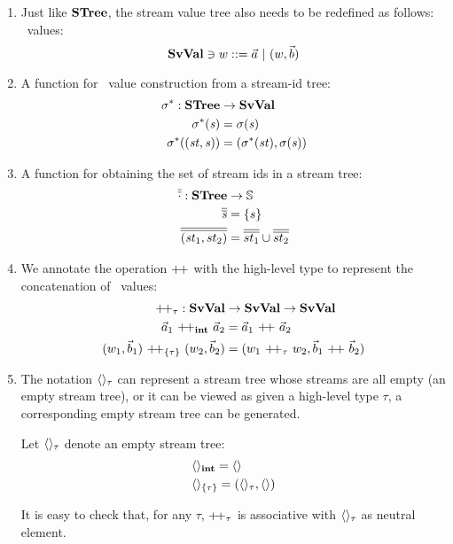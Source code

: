 \begin{enumerate}[(1)]
	\item Just like $\mathbf{STree}$, the stream value tree also needs to be redefined as follows:  
	\fmsvcode \  values: $$\SvVal \ni \v ::= \a \ | \ (\v,\b) $$
	
	\item A function for \fmsvcode \  value construction from a stream-id tree:
	\begin{align*}
	\sgm^* : \STree & \-> \SvVal \\
	\sgm^*(\s) & = \sgm(\s) \\
	\sgm^*((\st,\s)) & = (\sgm^*(\st), \sgm(\s)) 
	\end{align*}
	
	\item A function for obtaining the set of stream ids in a stream tree:	
	\begin{align*}
	\olol{\cdot} : \STree & \-> \mathbb{S} \\
	\olol{\s} & = \{s\} \\
	\olol{(\st_1,st_2)} & = \olol{st_1} \cup \olol{st_2}
	\end{align*}
	
	
	\item We annotate the operation ${\++}$ with the high-level type to represent the concatenation of \fmsvcode \  values: 
	\begin{align*}
	{\++}_{\tau}: \SvVal &\->  \SvVal \-> \SvVal \\
	\a_1 \ {\++}_{\int}  \ \a_2 &= \a_1 \ {\++} \ \a_2 \\
	{(w_1,\b_1)} \ {\++}_{\{\tau\}} \  {(w_2,\b_2)} &= ({w_1} \ {\++}_{\tau} \ {w_2}, {\b_1} \ {\++} \ {\b_2})
	\end{align*}
	


\item The notation $\langle \rangle_{\tau}$ can represent a stream tree whose streams are all empty (an empty stream  tree), or it can be viewed as given a high-level type $\tau$, a corresponding empty stream tree can be generated.
\begin{nota}
	Let $\langle \rangle_{\tau}$ denote an empty stream tree: 
	\begin{align*}
	&\langle \rangle_{\mathbf{int}} = \langle \rangle \\
	&\langle \rangle_{\{\tau\}} = (\langle \rangle_{\tau},\langle \rangle) 
	\end{align*}
\end{nota}

It is easy to check that, for any $\tau$, ${\++}_{\tau}$ is associative with $\langle \rangle_{\tau}$ as neutral element.


\end{enumerate}
